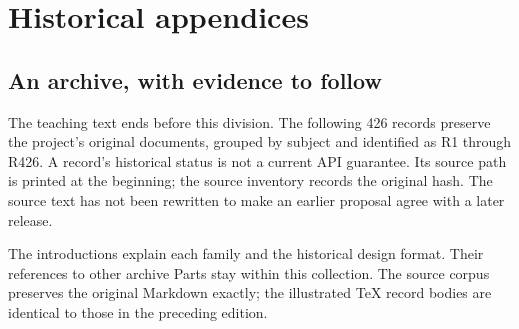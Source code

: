 \clearpage
\part{Historical appendices}\label{historical-appendices}
\chapter*{An archive, with evidence to follow}

The teaching text ends before this division. The following 426 records preserve the project's original documents, grouped by subject and identified as R1 through R426. A record's historical status is not a current API guarantee. Its source path is printed at the beginning; the source inventory records the original hash. The source text has not been rewritten to make an earlier proposal agree with a later release.

The introductions explain each family and the historical design format. Their references to other archive Parts stay within this collection. The source corpus preserves the original Markdown exactly; the illustrated TeX record bodies are identical to those in the preceding edition.

\setcounter{chapter}{0}
\renewcommand{\thechapter}{R\arabic{chapter}}
\renewcommand{\theHchapter}{record.\arabic{chapter}}
\ArchiveRecordtrue
%
%
%
%
%
%
\ArchiveRecordfalse
